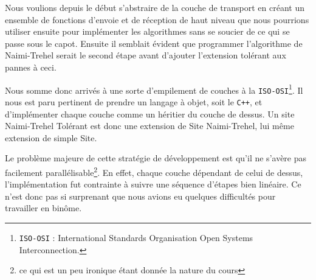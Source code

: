 Nous voulions depuis le début s'abstraire de la couche de transport en créant un ensemble de fonctions d'envoie et de réception de haut niveau que nous pourrions utiliser ensuite pour implémenter les algorithmes sans se soucier de ce qui se passe \og sous le capot\fg{}. Ensuite il semblait évident que programmer l'algorithme de Naimi-Trehel serait le second étape avant d'ajouter l'extension tolérant aux pannes à ceci.

Nous somme donc arrivés à une sorte d'empilement de couches à la \texttt{ISO-OSI}\footnote{\texttt{ISO-OSI} : International Standards Organisation Open Systems Interconnection.}. Il nous est paru pertinent de prendre un langage à objet, soit le \texttt{C++}, et d'implémenter chaque couche comme un héritier du couche de dessus. Un site Naimi-Trehel Tolérant est donc une extension de Site Naimi-Trehel, lui même extension de simple Site.

Le problème majeure de cette stratégie de développement est qu'il ne s'avère pas facilement parallélisable\footnote{ce qui est un peu ironique étant donnée la nature du cours}. En effet, chaque couche dépendant de celui de dessus, l'implémentation fut contrainte à suivre une séquence d'étapes bien linéaire. Ce n'est donc pas si surprenant que nous avions eu quelques difficultés pour travailler en binôme. 